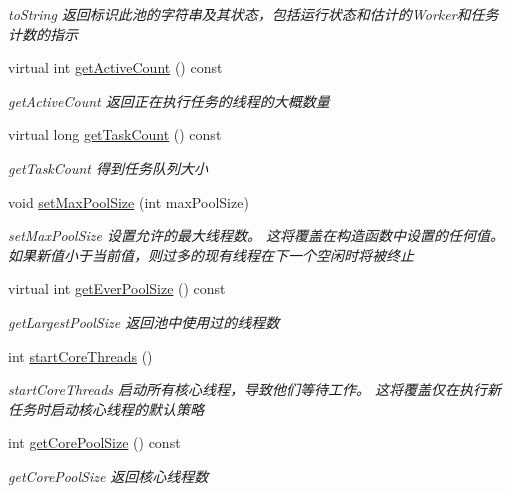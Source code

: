\begin{DoxyCompactItemize}
\begin{DoxyCompactList}\small\item\em to\+String 返回标识此池的字符串及其状态，包括运行状态和估计的\+Worker和任务计数的指示 \end{DoxyCompactList}\item 
virtual int \hyperlink{classThreadPoolExecutor_aff3ba9327ffbc4d5660f7600f1199c76}{get\+Active\+Count} () const
\begin{DoxyCompactList}\small\item\em get\+Active\+Count 返回正在执行任务的线程的大概数量 \end{DoxyCompactList}\item 
virtual long \hyperlink{classThreadPoolExecutor_a61e8321202e6b0f6ea014485e8e10450}{get\+Task\+Count} () const
\begin{DoxyCompactList}\small\item\em get\+Task\+Count 得到任务队列大小 \end{DoxyCompactList}\item 
void \hyperlink{classThreadPoolExecutor_a83e9e3715fdacc5b2f08b563d39bb62b}{set\+Max\+Pool\+Size} (int max\+Pool\+Size)
\begin{DoxyCompactList}\small\item\em set\+Max\+Pool\+Size 设置允许的最大线程数。 这将覆盖在构造函数中设置的任何值。 如果新值小于当前值，则过多的现有线程在下一个空闲时将被终止 \end{DoxyCompactList}\item 
virtual int \hyperlink{classThreadPoolExecutor_a95b11de2c239d02800cc388f2f20bc4b}{get\+Ever\+Pool\+Size} () const
\begin{DoxyCompactList}\small\item\em get\+Largest\+Pool\+Size 返回池中使用过的线程数 \end{DoxyCompactList}\item 
int \hyperlink{classThreadPoolExecutor_a560e912bb988292e81d16274e3d4a5d8}{start\+Core\+Threads} ()
\begin{DoxyCompactList}\small\item\em start\+Core\+Threads 启动所有核心线程，导致他们等待工作。 这将覆盖仅在执行新任务时启动核心线程的默认策略 \end{DoxyCompactList}\item 
int \hyperlink{classThreadPoolExecutor_a9099318ba5cab5dd05f219babba4b6b7}{get\+Core\+Pool\+Size} () const
\begin{DoxyCompactList}\small\item\em get\+Core\+Pool\+Size 返回核心线程数 \end{DoxyCompactList}\item 

\end{DoxyCompactItemize}
